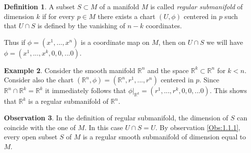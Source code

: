 \documentclass[12pt,a4paper]{report}
\theoremstyle{definition}
\newtheorem{Def}{Definition}[chapter]
\theoremstyle{Theorem}
\theoremstyle{definition}
\newtheorem{Ex}[Def]{Example}
\theoremstyle{definition}
\newtheorem{Obs}[Def]{Observation}
\begin{document}
	\begin{Def}
		A subset $S\subset M$ of a manifold $M$ is called \textit{regular submanifold} of dimension $k$ if for every $p\in M$ there exists a chart $(U,\phi)$ centered in $p$ such that $U\cap S$ is defined by the vanishing of $n-k$ coordinates.
	\end{Def}
	Thus if $\phi=(x^1,...,x^n)$ is a coordinate map on $M$, then on $U\cap S$ we will have $\phi=(x^1,...,x^k,0,0,...0)$.
	\begin{Ex}
		Consider the smooth manifold $\mathbb{R}^n$ and the space $\mathbb{R}^k\subset\mathbb{R}^n$ for $k<n$. Consider also the chart $(\mathbb{R}^n,\phi)=(\mathbb{R}^n,r^1,...,r^n)$ centered in $p$. Since $\mathbb{R}^n\cap \mathbb{R}^k=\mathbb{R}^k$ it immediately follows that $\phi|_{\mathbb{R}^k}=(r^1,...,r^k,0,0,...0)$. This shows that $\mathbb{R}^k$ is a regular submanifold of $\mathbb{R}^n$.
	\end{Ex}
	\begin{Obs} \label{Obs:1.1.2}
		In the definition of regular submanifold, the dimension of $S$ can coincide with the one of $M$. In this case $U\cap S=U$. By observation \ref{Obs:1.1.1}, every open subset $S$ of $M$ is a regular smooth submanifold of dimension equal to $M$.
	\end{Obs}
\end{document}
